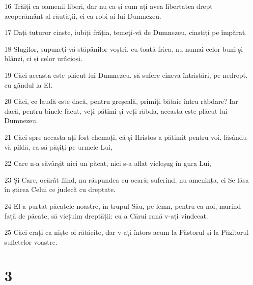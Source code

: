 \par 16 Trăiți ca oamenii liberi, dar nu ca și cum ați avea libertatea drept acoperământ al răutății, ci ca robi ai lui Dumnezeu.
\par 17 Dați tuturor cinste, iubiți frăția, temeți-vă de Dumnezeu, cinstiți pe împărat.
\par 18 Slugilor, supuneți-vă stăpânilor voștri, cu toată frica, nu numai celor buni și blânzi, ci și celor urâcioși.
\par 19 Căci aceasta este plăcut lui Dumnezeu, să sufere cineva întristări, pe nedrept, cu gândul la El.
\par 20 Căci, ce laudă este dacă, pentru greșeală, primiți bătaie întru răbdare? Iar dacă, pentru binele făcut, veți pătimi și veți răbda, aceasta este plăcut lui Dumnezeu.
\par 21 Căci spre aceasta ați fost chemați, că și Hristos a pătimit pentru voi, lăsându-vă pildă, ca să pășiți pe urmele Lui,
\par 22 Care n-a săvârșit nici un păcat, nici s-a aflat vicleșug în gura Lui,
\par 23 Și Care, ocărât fiind, nu răspundea cu ocară; suferind, nu amenința, ci Se lăsa în știrea Celui ce judecă cu dreptate.
\par 24 El a purtat păcatele noastre, în trupul Său, pe lemn, pentru ca noi, murind față de păcate, să viețuim dreptății: cu a Cărui rană v-ați vindecat.
\par 25 Căci erați ca niște oi rătăcite, dar v-ați întors acum la Păstorul și la Păzitorul sufletelor voastre.

\chapter{3}

